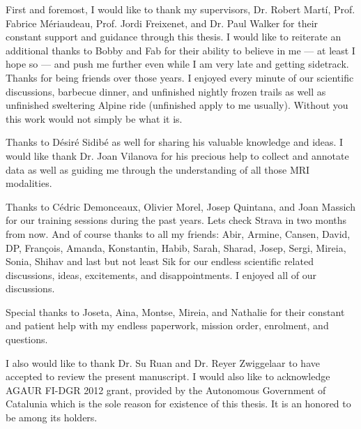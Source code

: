 

\begin{acknowledgements}      %
First and foremost, I would like to thank my supervisors, Dr. Robert Mart\'i, Prof. Fabrice M\'eriaudeau, Prof. Jordi Freixenet, and Dr. Paul Walker for their constant support and guidance through this thesis.
I would like to reiterate an additional thanks to Bobby and Fab for their ability to believe in me --- at least I hope so --- and push me further even while I am very late and getting sidetrack.
Thanks for being friends over those years.
I enjoyed every minute of our scientific discussions, barbecue dinner, and unfinished nightly frozen trails as well as unfinished sweltering Alpine ride (unfinished apply to me usually).
Without you this work would not simply be what it is. 

Thanks to D\'esir\'e Sidib\'e as well for sharing his valuable knowledge and ideas.
I would like thank Dr. Joan Vilanova for his precious help to collect and annotate data as well as guiding me through the understanding of all those MRI modalities.

Thanks to C\'edric Demonceaux, Olivier Morel, Josep Quintana, and Joan Massich for our training sessions during the past years.
Lets check Strava in two months from now.
And of course thanks to all my friends: Abir, Armine, Cansen, David, DP, Fran\c{c}ois, Amanda, Konstantin, Habib, Sarah, Sharad, Josep, Sergi, Mireia, Sonia, Shihav and last but not least Sik for our endless scientific related discussions, ideas, excitements, and disappointments.
I enjoyed all of our discussions.

Special thanks to Joseta, Aina, Montse, Mireia, and Nathalie for their constant and patient help with my endless paperwork, mission order, enrolment, and questions.

I also would like to thank Dr. Su Ruan and Dr. Reyer Zwiggelaar to have accepted to review the present manuscript.
I would also like to acknowledge AGAUR FI-DGR 2012 grant, provided by the Autonomous Government of Catalunia which is the sole reason for existence of this thesis.
It is an honored to be among its holders.


\end{acknowledgements}
